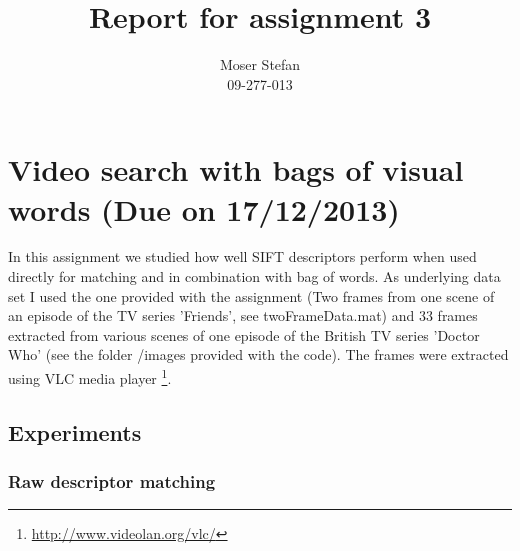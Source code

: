 \documentclass{paper}
\title{Report for assignment 3}
\author{Moser Stefan\\09-277-013}
\begin{document}
\maketitle

\section{Video search with bags of visual words (Due on 17/12/2013)}
In this assignment we studied how well SIFT descriptors perform when used directly 
for matching and in combination with bag of words. As underlying data set I used the
one provided with the assignment (Two frames from one scene of an episode of the TV series 'Friends',
see twoFrameData.mat) and 33 frames extracted from various scenes of one episode of the
British TV series 'Doctor Who' (see the folder /images provided with the code). The
frames were extracted using VLC media player \footnote{\url{http://www.videolan.org/vlc/}}.

\subsection{Experiments}
\subsubsection{Raw descriptor matching}
\end{document}
